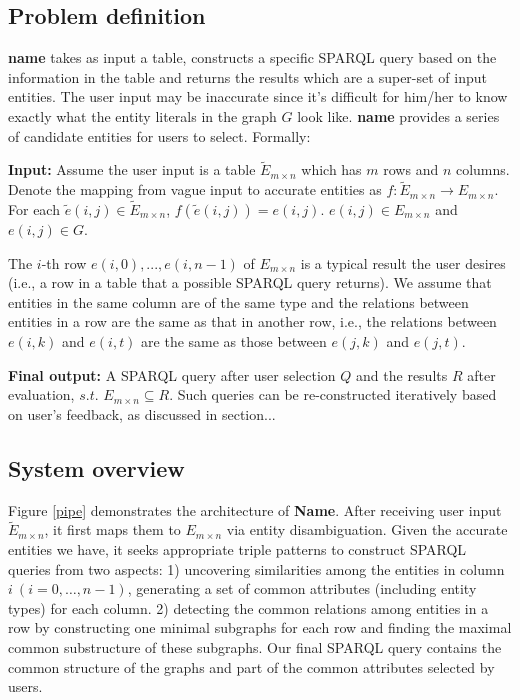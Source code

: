 \documentclass[10pt,conference,letterpaper]{IEEEtran}
\begin{document}
\subsection{Problem definition}
\textbf{name} takes as input a table, constructs a specific SPARQL query based on the information in the table and returns the results which are a super-set of input entities. The user input may be inaccurate since it's difficult for him/her to know exactly what the entity literals in the graph $G$ look like. \textbf{name} provides a series of candidate entities for users to select.
Formally:

\textup{\textbf{Input:} Assume the user input is a table $\tilde{E}_{m \times n}$ which has $m$ rows and $n$ columns.
Denote the mapping from vague input to accurate entities as $f: \tilde{E}_{m \times n} \rightarrow E_{m \times n}$. For each $\tilde{e}(i,j) \in \tilde{E}_{m \times n}$, $f(\tilde{e}(i,j))=e(i, j)$. $e(i,j) \in  E_{m \times n}$ and $e(i,j) \in G$.}

The $i$-th row  $e(i,0),...,e(i, n-1) $ of $E_{m \times n}$ is a typical result the user desires (i.e., a row in a table that a possible SPARQL query returns).
We assume that entities in the same column
are of the same type and the relations between entities in a row are the same
as that in another row, i.e., the relations between
$e(i, k)$ and $e(i, t)$ are the same as those between $e(j,k)$
and $e(j,t)$.

\textbf{Final output:} A SPARQL query after user selection
$Q$ and the results $R$ after evaluation, $s.t.$ $E_{m \times n} \subseteq R.$ Such queries can be re-constructed iteratively based on user's feedback, as discussed in section...


\subsection{System overview}
Figure \ref{pipe} demonstrates the architecture of \textbf{Name}. 
After receiving user input $\tilde{E}_{m \times n}$, it first maps them to ${E}_{m \times n}$ via entity disambiguation. 
Given the accurate entities we have, it seeks appropriate triple patterns to construct SPARQL queries from two aspects: 1) uncovering similarities among the entities in column $i \ (i = 0,\ldots,n-1)$,
 generating a set of common attributes (including entity types) for each column.
 2) detecting the 
 common relations among entities in a row by constructing one minimal subgraphs for each row and finding the maximal common substructure of these subgraphs.
Our final SPARQL query contains the common structure of the graphs and part of
the common attributes selected by users.
\end{document}
